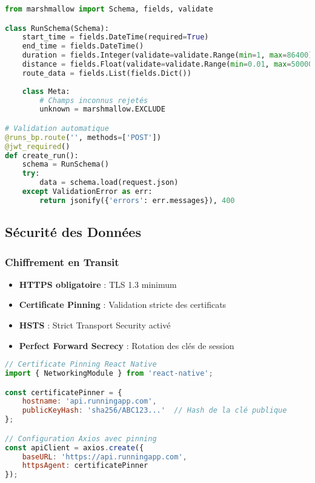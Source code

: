 \begin{lstlisting}[language=python]
from marshmallow import Schema, fields, validate

class RunSchema(Schema):
    start_time = fields.DateTime(required=True)
    end_time = fields.DateTime()
    duration = fields.Integer(validate=validate.Range(min=1, max=86400))
    distance = fields.Float(validate=validate.Range(min=0.01, max=500000))
    route_data = fields.List(fields.Dict())
    
    class Meta:
        # Champs inconnus rejetés
        unknown = marshmallow.EXCLUDE

# Validation automatique
@runs_bp.route('', methods=['POST'])
@jwt_required()
def create_run():
    schema = RunSchema()
    try:
        data = schema.load(request.json)
    except ValidationError as err:
        return jsonify({'errors': err.messages}), 400
\end{lstlisting}

\subsection{Sécurité des Données}

\subsubsection{Chiffrement en Transit}

\begin{itemize}
    \item \textbf{HTTPS obligatoire} : TLS 1.3 minimum
    \item \textbf{Certificate Pinning} : Validation stricte des certificats
    \item \textbf{HSTS} : Strict Transport Security activé
    \item \textbf{Perfect Forward Secrecy} : Rotation des clés de session
\end{itemize}

\begin{lstlisting}[language=javascript]
// Certificate Pinning React Native
import { NetworkingModule } from 'react-native';

const certificatePinner = {
    hostname: 'api.runningapp.com',
    publicKeyHash: 'sha256/ABC123...'  // Hash de la clé publique
};

// Configuration Axios avec pinning
const apiClient = axios.create({
    baseURL: 'https://api.runningapp.com',
    httpsAgent: certificatePinner
});
\end{lstlisting}

